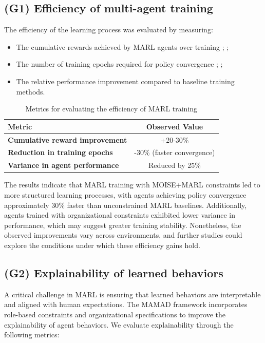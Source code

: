 \documentclass[pdflatex,sn-mathphys-num]{sn-jnl}%
\theoremstyle{thmstyleone}%
\theoremstyle{thmstyletwo}%
\theoremstyle{thmstylethree}%
\begin{document}
\subsection{(G1) Efficiency of multi-agent training}

The efficiency of the learning process was evaluated by measuring:
\begin{itemize}
    \item The cumulative rewards achieved by MARL agents over training ; ;
    \item The number of training epochs required for policy convergence ; ;
    \item The relative performance improvement compared to baseline training methods.
\end{itemize}

\begin{table}[h!]
    \centering
    \caption{Metrics for evaluating the efficiency of MARL training}
    \begin{tabular}{|l|c|}
        \hline
        \textbf{Metric} & \textbf{Observed Value} \\
        \hline
        \textbf{Cumulative reward improvement} & +20-30\% \\
        \hline
        \textbf{Reduction in training epochs} & -30\% (faster convergence) \\
        \hline
        \textbf{Variance in agent performance} & Reduced by 25\% \\
        \hline
    \end{tabular}
    \label{tab:efficiency}
\end{table}

The results indicate that MARL training with MOISE+MARL constraints led to more structured learning processes, with agents achieving policy convergence approximately 30\% faster than unconstrained MARL baselines. Additionally, agents trained with organizational constraints exhibited lower variance in performance, which may suggest greater training stability. Nonetheless, the observed improvements vary across environments, and further studies could explore the conditions under which these efficiency gains hold.

\subsection{(G2) Explainability of learned behaviors}

A critical challenge in MARL is ensuring that learned behaviors are interpretable and aligned with human expectations. The MAMAD framework incorporates role-based constraints and organizational specifications to improve the explainability of agent behaviors. We evaluate explainability through the following metrics:
\end{document}
